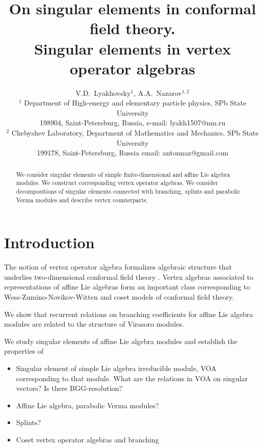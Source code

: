 \documentclass[12pt]{article}
\begin{document}
\title{On singular elements in conformal field theory. \\ Singular elements in vertex operator algebras}



\author{V.D.~Lyakhovsky$^1$, A.A.~Nazarov$^{1,2}$ \\
  {\small $^1$ Department of High-energy and elementary particle physics, SPb State University}\\
  {\small 198904, Saint-Petersburg, Russia,}
  {\small e-mail: lyakh1507@nm.ru}\\
  {\small$^{2}$ Chebyshev Laboratory,}
  {\small Department of Mathematics and Mechanics, SPb State University}\\
  {\small 199178, Saint-Petersburg, Russia}
  {\small email: antonnaz@gmail.com}}
\date{}
\maketitle

\begin{abstract}
  We consider singular elements of simple finite-dimensional and affine Lie algebra modules. We
  construct corresponding vertex operator algebras. We consider decompositions of singular elements
  connected with branching, splints and parabolic Verma modules and describe vertex counterparts. 
\end{abstract}

\section{Introduction}
The notion of vertex operator algebra \cite{borcherds1986vertex} formalizes
algebraic structure that underlies two-dimensional conformal field theory
\cite{kac1998vertex,frenkel1988vertex}. Vertex algebras associated to
representations of affine Lie algebras \cite{frenkel1992vertex} form an
important class corresponding to Wess-Zumino-Novikov-Witten
\cite{witten1984nab,Walton:1999xc} and coset models \cite{Goddard198588} of
conformal field theory.

We show that recurrent relations on branching coefficients for affine Lie
algebra modules are related to the structure of Virasoro modules. 

We study singular elements of affine Lie algebra modules and establish the properties
of 


\begin{itemize}
\item Singular element of simple Lie algebra irreducible module, VOA corresponding to that module.
  What are the relations in VOA on singular vectors? Is there BGG-resolution?
\item Affine Lie algebra, parabolic Verma modules?
\item Splints?
\item Coset vertex operator algebras and branching
\end{itemize}
\end{document}

